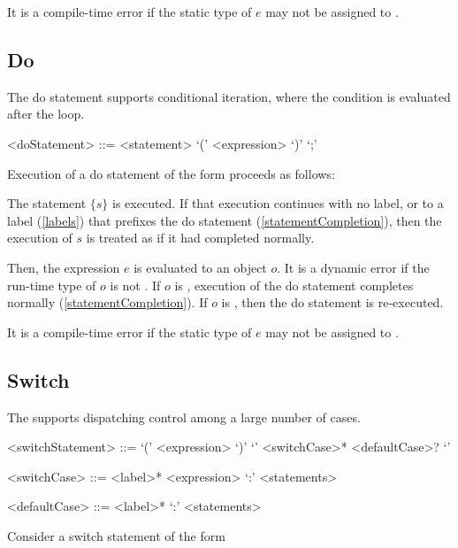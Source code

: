 \documentclass[makeidx]{article}
\begin{document}
{\LMHash{}%
It is a compile-time error if
the static type of $e$ may not be assigned to .


\subsection{Do}

\LMHash{}%
The do statement supports conditional iteration,
where the condition is evaluated after the loop.

\begin{grammar}
<doStatement> ::= \DO{} <statement> \WHILE{} `(' <expression> `)' `;'
\end{grammar}

\LMHash{}%
Execution of a do statement of the form 
proceeds as follows:

\LMHash{}%
The statement $\{s\}$ is executed.
If that execution continues with no label,
or to a label (\ref{labels}) that prefixes the do statement
(\ref{statementCompletion}),
then the execution of $s$ is treated as if it had completed normally.

\LMHash{}%
Then, the expression $e$ is evaluated to an object $o$.
It is a dynamic error if the run-time type of $o$ is not .
If $o$ is \FALSE, execution of the do statement completes normally
(\ref{statementCompletion}).
If $o$ is \TRUE, then the do statement is re-executed.

\LMHash{}%
It is a compile-time error if the static type of $e$
may not be assigned to .


\subsection{Switch}

\LMHash{}%
The  supports dispatching control among
a large number of cases.

\begin{grammar}
<switchStatement> ::= \gnewline{}
  \SWITCH{} `(' <expression> `)' `{' <switchCase>* <defaultCase>? `}'

<switchCase> ::= <label>* \CASE{} <expression> `:' <statements>

<defaultCase> ::= <label>* \DEFAULT{} `:' <statements>
\end{grammar}

\LMHash{}%
Consider a switch statement of the form

}
\end{document}

